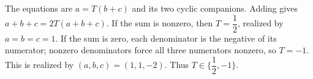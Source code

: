 The equations are $a=T(b+c)$ and its two cyclic companions. Adding gives $a+b+c=2T(a+b+c)$. If the sum is nonzero, then $T=\dfrac{1}{2}$, realized by $a=b=c=1$. If the sum is zero, each denominator is the negative of its numerator; nonzero denominators force all three numerators nonzero, so $T=-1$. This is realized by $(a,b,c)=(1,1,-2)$. Thus $\boxed{T\in\{\dfrac{1}{2},-1\}}$.
